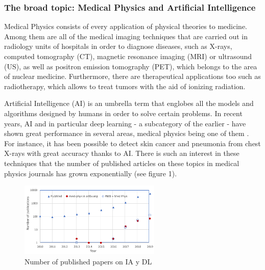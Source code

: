 \documentclass[11pt]{article} %
\begin{document}
\subsubsection{The broad topic: Medical Physics and Artificial Intelligence}
	
	Medical Physics consists of every application of physical theories to medicine. Among them are all of the medical imaging techniques that are carried out in radiology units of hospitals in order to diagnose diseases, such as X-rays, computed tomography (CT), magnetic resonance imaging (MRI) or ultrasound (US), as well as positron emission tomography (PET), which belongs to the area of nuclear medicine. Furthermore, there are therapeutical applications too such as radiotherapy, which allows to treat tumors with the aid of ionizing radiation.
	
	Artificial Intelligence (AI) is an umbrella term that englobes all the models and algorithms designed by humans in order to solve certain problems. In recent years, AI and in particular deep learning - a subcategory of the earlier - have shown great performance in several areas, medical physics being one of them \cite{shen}. For instance, it has been possible to detect skin cancer \cite{esteva} and pneumonia from chest X-rays \cite{rajpurkar} with great accuracy thanks to AI. There is such an interest in these techniques that the number of published articles on these topics in medical physics journals has grown exponentially (see figure 1).
	
	
	\begin{figure}[h]
	\centering
	\includegraphics[width=0.6\textwidth]{figuras/DL_papers.png}	
	\caption{Number of published papers on IA y DL \cite{shen}}	
	\end{figure}
	
\end{document}
